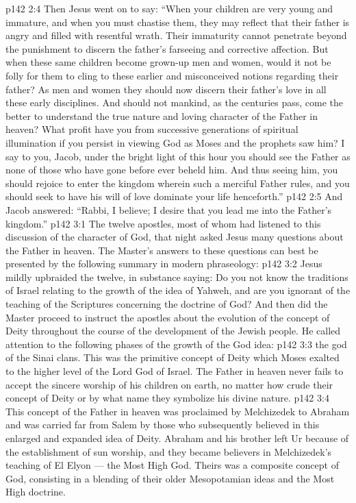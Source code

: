 \vs p142 2:4 \pc Then Jesus went on to say: \textcolor{ubdarkred}{“When your children are very young and immature, and when you must chastise them, they may reflect that their father is angry and filled with resentful wrath. Their immaturity cannot penetrate beyond the punishment to discern the father’s farseeing and corrective affection. But when these same children become grown\hyp{}up men and women, would it not be folly for them to cling to these earlier and misconceived notions regarding their father? As men and women they should now discern their father’s love in all these early disciplines. And should not mankind, as the centuries pass, come the better to understand the true nature and loving character of the Father in heaven? What profit have you from successive generations of spiritual illumination if you persist in viewing God as Moses and the prophets saw him? I say to you, Jacob, under the bright light of this hour you should see the Father as none of those who have gone before ever beheld him. And thus seeing him, you should rejoice to enter the kingdom wherein such a merciful Father rules, and you should seek to have his will of love dominate your life henceforth.”}
\vs p142 2:5 And Jacob answered: “Rabbi, I believe; I desire that you lead me into the Father’s kingdom.”
\vs p142 3:1 The twelve apostles, most of whom had listened to this discussion of the character of God, that night asked Jesus many questions about the Father in heaven. The Master’s answers to these questions can best be presented by the following summary in modern phraseology:
\vs p142 3:2 Jesus mildly upbraided the twelve, in substance saying: Do you not know the traditions of Israel relating to the growth of the idea of Yahweh, and are you ignorant of the teaching of the Scriptures concerning the doctrine of God? And then did the Master proceed to instruct the apostles about the evolution of the concept of Deity throughout the course of the development of the Jewish people. He called attention to the following phases of the growth of the God idea:
\vs p142 3:3 \bibnobreakspace {} the god of the Sinai clans. This was the primitive concept of Deity which Moses exalted to the higher level of the Lord God of Israel. The Father in heaven never fails to accept the sincere worship of his children on earth, no matter how crude their concept of Deity or by what name they symbolize his divine nature.
\vs p142 3:4 \pc {}\bibnobreakspace {} This concept of the Father in heaven was proclaimed by Melchizedek to Abraham and was carried far from Salem by those who subsequently believed in this enlarged and expanded idea of Deity. Abraham and his brother left Ur because of the establishment of sun worship, and they became believers in Melchizedek’s teaching of El Elyon --- the Most High God. Theirs was a composite concept of God, consisting in a blending of their older Mesopotamian ideas and the Most High doctrine.
